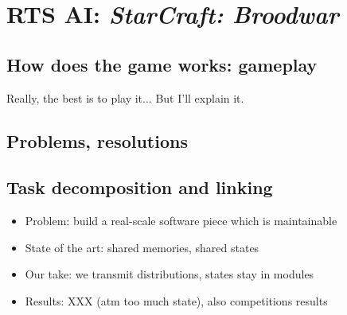 \chapter{RTS AI: \textit{StarCraft: Broodwar}}

\section{How does the game works: gameplay}
Really, the best is to play it... But I'll explain it.

\section{Problems, resolutions}

\section{Task decomposition and linking}
\begin{itemize}
\item Problem: build a real-scale software piece which is maintainable
\item State of the art: shared memories, shared states
\item Our take: we transmit distributions, states stay in modules
\item Results: XXX (atm too much state), also competitions results
\end{itemize}

